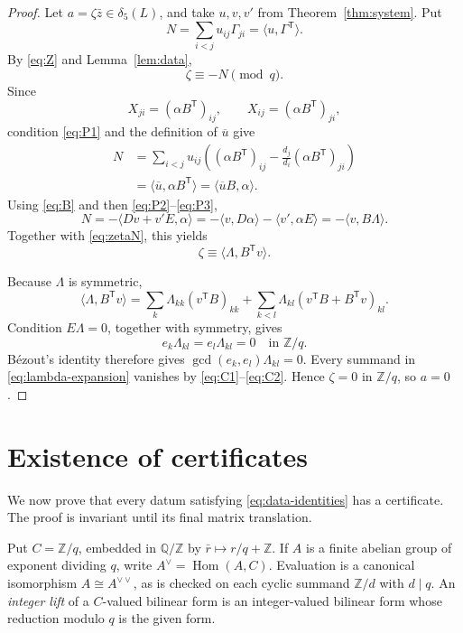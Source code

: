 \documentclass[11pt]{amsart}
\theoremstyle{definition}
\theoremstyle{remark}
\newcommand{\Z}{\mathbb Z}
\newcommand{\Q}{\mathbb Q}
\newcommand{\del}{\delta}
\newcommand{\Hom}{\operatorname{Hom}}
\newcommand{\pair}[2]{\langle #1,#2\rangle}
\begin{document}
\begin{proof}
Let \(a=\zeta\bar z\in\del_5(L)\), and take \(u,v,v'\) from
Theorem~\ref{thm:system}.  Put
\[
 N=\sum_{i<j}u_{ij}\Gamma_{ji}
   =\pair{u}{\Gamma^{\mathsf T}}.
\]
By \eqref{eq:Z} and Lemma~\ref{lem:data},
\begin{equation}\label{eq:zetaN}
                            \zeta\equiv-N\pmod q.
\end{equation}
Since
\[
 X_{ji}=(\alpha B^{\mathsf T})_{ij},
 \qquad X_{ij}=(\alpha B^{\mathsf T})_{ji},
\]
condition \eqref{eq:P1} and the definition of \(\overline u\) give
\[
\begin{aligned}
 N
 &=\sum_{i<j}u_{ij}
   \left((\alpha B^{\mathsf T})_{ij}
       -\frac{d_j}{d_i}(\alpha B^{\mathsf T})_{ji}\right)\\
 &=\pair{\overline u}{\alpha B^{\mathsf T}}
  =\pair{\overline uB}{\alpha}.
\end{aligned}
\]
Using \eqref{eq:B} and then \eqref{eq:P2}--\eqref{eq:P3},
\[
 N=-\pair{Dv+v'E}{\alpha}
   =-\pair{v}{D\alpha}-\pair{v'}{\alpha E}
   =-\pair{v}{B\Lambda}.
\]
Together with \eqref{eq:zetaN}, this yields
\begin{equation}\label{eq:zeta-lambda}
                   \zeta\equiv\pair{\Lambda}{B^{\mathsf T}v}.
\end{equation}

Because \(\Lambda\) is symmetric,
\begin{equation}\label{eq:lambda-expansion}
 \pair{\Lambda}{B^{\mathsf T}v}
 =\sum_k\Lambda_{kk}(v^{\mathsf T}B)_{kk}
  +\sum_{k<l}\Lambda_{kl}
       (v^{\mathsf T}B+B^{\mathsf T}v)_{kl}.
\end{equation}
Condition \(E\Lambda=0\), together with symmetry, gives
\[
 e_k\Lambda_{kl}=e_l\Lambda_{kl}=0\quad\text{in }\Z/q.
\]
B\'ezout's identity therefore gives
\(\gcd(e_k,e_l)\Lambda_{kl}=0\).  Every summand in
\eqref{eq:lambda-expansion}
vanishes by \eqref{eq:C1}--\eqref{eq:C2}.  Hence
\(\zeta=0\) in \(\Z/q\), so \(a=0\).
\end{proof}

\section{Existence of certificates}

We now prove that every datum satisfying
\eqref{eq:data-identities} has a certificate.  The proof is invariant
until its final matrix translation.

Put \(C=\Z/q\), embedded in \(\Q/\Z\) by
\(\bar r\mapsto r/q+\Z\).  If \(A\) is a finite abelian group of
exponent dividing \(q\), write \(A^\vee=\Hom(A,C)\).  Evaluation is a
canonical isomorphism \(A\cong A^{\vee\vee}\), as is checked on each
cyclic summand \(\Z/d\) with \(d\mid q\).
An \emph{integer lift} of a \(C\)-valued bilinear form is an
integer-valued bilinear form whose reduction modulo \(q\) is the given
form.
\end{document}
